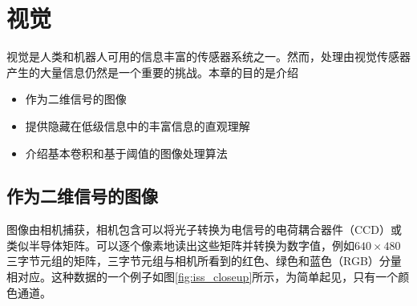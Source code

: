\chapter{视觉}
\label{chap:vision}


视觉是人类和机器人可用的信息丰富的传感器系统之一。然而，处理由视觉传感器产生的大量信息仍然是一个重要的挑战。本章的目的是介绍

\begin{itemize}

\item 作为二维信号的图像
\item 提供隐藏在低级信息中的丰富信息的直观理解
\item 介绍基本卷积和基于阈值的图像处理算法
\end{itemize}

\section{作为二维信号的图像}


图像由相机捕获，相机包含可以将光子转换为电信号的电荷耦合器件（CCD）或类似半导体矩阵。可以逐个像素地读出这些矩阵并转换为数字值，例如$640\times 480$三字节元组的矩阵，三字节元组与相机所看到的红色、绿色和蓝色（RGB）分量相对应。这种数据的一个例子如图\ref{fig:iss_closeup}所示，为简单起见，只有一个颜色通道。

